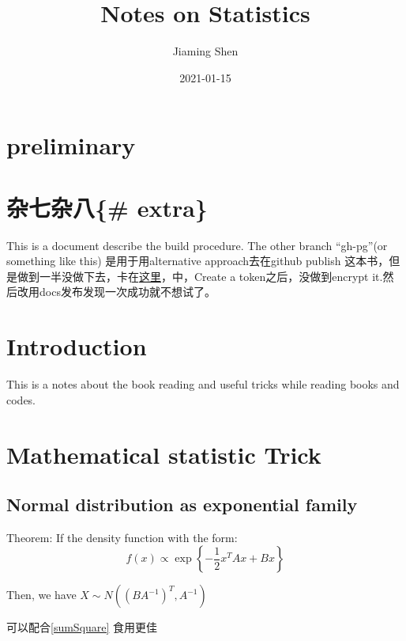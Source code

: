\documentclass[
]{book}
\title{Notes on Statistics}
\author{Jiaming Shen}
\date{2021-01-15}
\theoremstyle{definition}
\theoremstyle{definition}
\theoremstyle{definition}
\theoremstyle{remark}
\begin{document}
\maketitle

{
\setcounter{tocdepth}{1}
\tableofcontents
}
\hypertarget{preliminary}{%
\chapter*{preliminary}\label{preliminary}}

\hypertarget{ux6742ux4e03ux6742ux516b-extra}{%
\chapter{杂七杂八\{\# extra\}}\label{ux6742ux4e03ux6742ux516b-extra}}

This is a document describe the build procedure.
The other branch ``gh-pg''(or something like this) 是用于用alternative approach去在github publish 这本书，但是做到一半没做下去，卡在\href{https://bookdown.org/yihui/bookdown/github.html}{这里}，中，Create a token之后，没做到encrypt it.然后改用docs发布发现一次成功就不想试了。

\hypertarget{intro}{%
\chapter{Introduction}\label{intro}}

This is a notes about the book reading and useful tricks while reading books and codes.

\hypertarget{mathematical-statistic-trick}{%
\chapter{Mathematical statistic Trick}\label{mathematical-statistic-trick}}

\hypertarget{NormalForm}{%
\section{Normal distribution as exponential family}\label{NormalForm}}

Theorem: If the density function with the form:
\[
f(x) \propto \exp \left\{-\frac{1}{2} x^{T} A x+B x\right\}
\]

Then, we have \(X\sim N\left(\left(B A^{-1}\right)^{T}, A^{-1}\right)\)

可以配合\ref{sumSquare} 食用更佳
\end{document}

